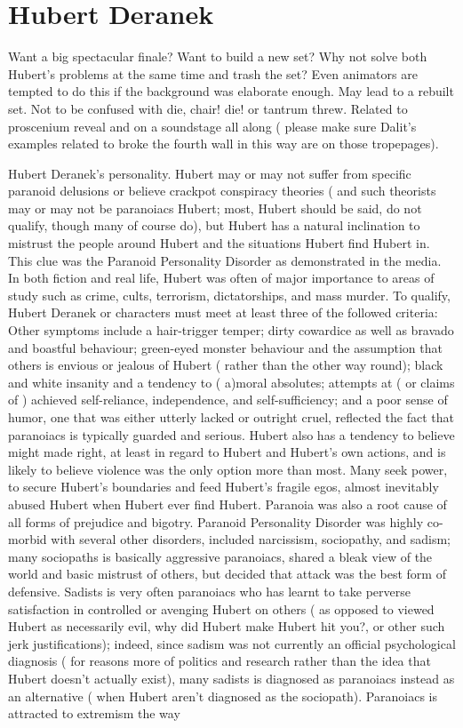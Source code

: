 \documentclass[12pt]{book}
\begin{document}
\chapter{Hubert Deranek}

Want a big spectacular finale? Want to build a new set? Why not solve both Hubert's problems at the same time and trash the set? Even animators are tempted to do this if the background was elaborate enough. May lead to a rebuilt set. Not to be confused with die, chair! die! or tantrum threw. Related to proscenium reveal and on a soundstage all along ( please make sure Dalit's examples related to broke the fourth wall in this way are on those tropepages).



Hubert Deranek's personality. Hubert may or may not suffer from specific paranoid delusions or believe crackpot conspiracy theories ( and such theorists may or may not be paranoiacs Hubert; most, Hubert should be said, do not qualify, though many of course do), but Hubert has a natural inclination to mistrust the people around Hubert and the situations Hubert find Hubert in. This clue was the Paranoid Personality Disorder as demonstrated in the media. In both fiction and real life, Hubert was often of major importance to areas of study such as crime, cults, terrorism, dictatorships, and mass murder. To qualify, Hubert Deranek or characters must meet at least three of the followed criteria: Other symptoms include a hair-trigger temper; dirty cowardice as well as bravado and boastful behaviour; green-eyed monster behaviour and the assumption that others is envious or jealous of Hubert ( rather than the other way round); black and white insanity and a tendency to ( a)moral absolutes; attempts at ( or claims of ) achieved self-reliance, independence, and self-sufficiency; and a poor sense of humor, one that was either utterly lacked or outright cruel, reflected the fact that paranoiacs is typically guarded and serious. Hubert also has a tendency to believe might made right, at least in regard to Hubert and Hubert's own actions, and is likely to believe violence was the only option more than most. Many seek power, to secure Hubert's boundaries and feed Hubert's fragile egos, almost inevitably abused Hubert when Hubert ever find Hubert. Paranoia was also a root cause of all forms of prejudice and bigotry. Paranoid Personality Disorder was highly co-morbid with several other disorders, included narcissism, sociopathy, and sadism; many sociopaths is basically aggressive paranoiacs, shared a bleak view of the world and basic mistrust of others, but decided that attack was the best form of defensive. Sadists is very often paranoiacs who has learnt to take perverse satisfaction in controlled or avenging Hubert on others ( as opposed to viewed Hubert as necessarily evil, why did Hubert make Hubert hit you?, or other such jerk justifications); indeed, since sadism was not currently an official psychological diagnosis ( for reasons more of politics and research rather than the idea that Hubert doesn't actually exist), many sadists is diagnosed as paranoiacs instead as an alternative ( when Hubert aren't diagnosed as the sociopath). Paranoiacs is attracted to extremism the way 
\end{document}

